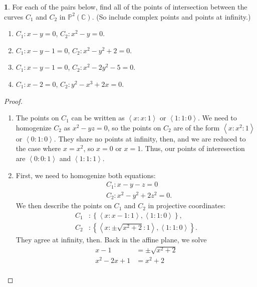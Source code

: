 \documentclass[12pt]{article}
\theoremstyle{definition}
\newtheorem{ex}{}
\begin{document}
\begin{ex}
	For each of the pairs below, find all of the points of intersection between the curves $C_1$ and $C_2$ in $\mathbb{P}^2(\mathbb{C})$.
	(So include complex points and points at infinity.)
	\begin{enumerate}[label=(\alph*)]
		\item $C_1 : x - y = 0$, $C_2 : x^2 - y = 0$.
		\item $C_1 : x - y - 1 = 0$, $C_2: x^2 - y^2 + 2 = 0$.
		\item $C_1 : x - y - 1 = 0$, $C_2 : x^2 - 2y^2 - 5 = 0$.
		\item $C_1 : x-2=0$, $C_2 : y^2 - x^3 + 2x = 0$.
	\end{enumerate}
\end{ex}
\begin{proof}\
	\begin{enumerate}[label=(\alph*)]
		\item The points on $C_1$ can be written as $\left\langle x : x : 1 \right\rangle$ or $\left\langle 1 : 1 : 0 \right\rangle$.
		      We need to homogenize $C_2$ as $x^2 - yz = 0$, so the points on $C_2$ are of the form $\left\langle x : x^2 : 1 \right\rangle$ or $\left\langle 0 : 1 : 0 \right\rangle$.
		      They share no points at infinity, then, and we are reduced to the case where $x = x^2$, so $x = 0$ or $x = 1$.
		      Thus, our points of interesection are $\left\langle 0 : 0 : 1 \right\rangle$ and $\left\langle 1 : 1 : 1 \right\rangle$.
		\item First, we need to homogenize both equations: \begin{align*}
			       & C_1 : x - y - z = 0         \\
			       & C_2 : x^2 - y^2 + 2z^2 = 0.
		      \end{align*}
		      We then describe the points on $C_1$ and $C_2$ in projective coordinates: \begin{align*}
			      C_1 & : \left\lbrace \left\langle x : x - 1 : 1 \right\rangle, \left\langle 1 : 1 : 0 \right\rangle \right\rbrace,             \\
			      C_2 & : \left\lbrace \left\langle x : \pm\sqrt{x^2 + 2} : 1 \right\rangle, \left\langle 1 : 1 : 0 \right\rangle \right\rbrace.
		      \end{align*}
		      They agree at infinity, then.
		      Back in the affine plane, we solve \begin{align*}
			      x - 1        & = \pm\sqrt{x^2 + 2} \\
			      x^2 - 2x + 1 & = x^2 + 2           \\

\end{align*}
\end{enumerate}
\end{proof}
\end{document}
